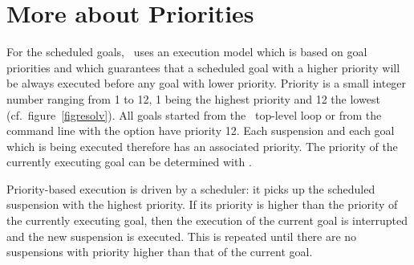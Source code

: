 \section{More about Priorities}
For the scheduled goals,
\eclipse\ uses an execution model which is based on goal priorities
and which guarantees that a scheduled goal with a higher priority
will be always executed before any goal with lower priority.
Priority is a small integer number ranging from 1 to 12,
1 being the highest priority and 12 the lowest
(cf.\ figure~\ref{figresolv}).
All goals started from the \eclipse\ top-level loop
or from the command line with the  option have priority 12.
Each suspension and each goal which is being
executed therefore has an associated priority.
The priority of the currently executing goal can be determined
with .

Priority-based execution is driven by a scheduler:
it picks up the scheduled suspension with the highest priority.
If its priority is higher than the priority of the currently
executing goal, then the execution of the current goal
is interrupted and the new suspension is executed.
This is repeated until there are no suspensions
with priority higher than that of the current goal.


